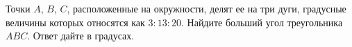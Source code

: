 \begin{ex}
	\begin{condition}
		Точки \( A \), \( B \), \( C \), расположенные на окружности, делят ее на три дуги, градусные величины которых относятся как \( 3:13:20 \). Найдите больший угол треугольника \( ABC \). Ответ дайте в градусах.
	\end{condition}
\end{ex}